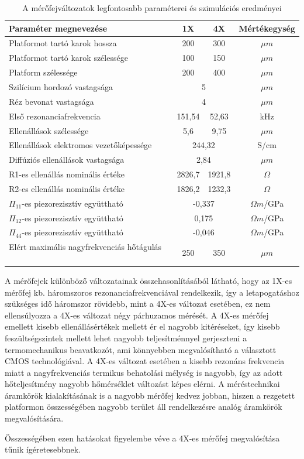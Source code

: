 \begin{table}[!ht]
    \centering
    \begin{tabular}{@{}lccc@{}}
        \toprule
        \textbf{Paraméter megnevezése} & \textbf{1X} & \textbf{4X} & \textbf{Mértékegység} \\
        \hline
        Platformot tartó karok hossza & 200 & 300 & $\mu m$ \\
        Platformot tartó karok szélessége & 100 & 150 & $\mu m$ \\
        Platform szélessége & 200 & 400 & $\mu m$ \\
        Szilícium hordozó vastagsága & \multicolumn{2}{c}{5} & $\mu m$ \\
        Réz bevonat vastagsága & \multicolumn{2}{c}{4} & $\mu m$ \\
        Első rezonanciafrekvencia & 151,54 & 52,63 & kHz \\
        Ellenállások szélessége & 5,6 & 9,75 & $\mu m$ \\
        Ellenállások elektromos vezetőképessége & \multicolumn{2}{c}{244,32} & S/cm \\
        Diffúziós ellenállások vastagsága & \multicolumn{2}{c}{2,84} & $\mu m$ \\
        R1-es ellenállás nominális értéke & 2826,7 & 1921,8 & $\Omega$ \\
        R2-es ellenállás nominális értéke & 1826,2 & 1232,3 & $\Omega$ \\
        $\Pi_{11}$-es piezorezisztív együttható & \multicolumn{2}{c}{-0,337} & $\Omega m$/GPa\\
        $\Pi_{12}$-es piezorezisztív együttható & \multicolumn{2}{c}{0,175} & $\Omega m$/GPa \\
        $\Pi_{44}$-es piezorezisztív együttható & \multicolumn{2}{c}{-0,046} & $\Omega m$/GPa \\
        Elért maximális nagyfrekvenciás hőtágulás $\phantom{abc}$ & 250 & 350 & $\mu m$ \\
        \bottomrule
    \end{tabular}
    \caption{A mérőfejváltozatok legfontosabb paraméterei és szimulációs eredményei}
    \label{tab:compare}
\end{table}

A mérőfejek különböző változatainak összehasonlításából látható, hogy az 1X-es mérőfej kb. háromszoros rezonanciafrekvenciával rendelkezik, így a letapogatáshoz szükséges idő háromszor rövidebb, mint a 4X-es változat esetében, ez nem ellensúlyozza a 4X-es változat négy párhuzamos mérését. A 4X-es mérőfej emellett kisebb ellenállásértékek mellett ér el nagyobb kitéréseket, így kisebb feszültségszintek mellett lehet nagyobb teljesítménnyel gerjeszteni a termomechanikus beavatkozót, ami könnyebben megvalósítható a választott CMOS technológiával. A 4X-es változat esetében a kisebb rezonáns frekvencia miatt a nagyfrekvenciás termikus behatolási mélység is nagyobb, így az adott hőteljesítmény nagyobb hőmérséklet változást képes elérni. A méréstechnikai áramkörök kialakításának is a nagyobb mérőfej kedvez jobban, hiszen a rezgetett platformon összességében nagyobb terület áll rendelkezésre analóg áramkörök megvalósítására.

Összességében ezen hatásokat figyelembe véve a 4X-es mérőfej megvalósítása tűnik ígéretesebbnek.
